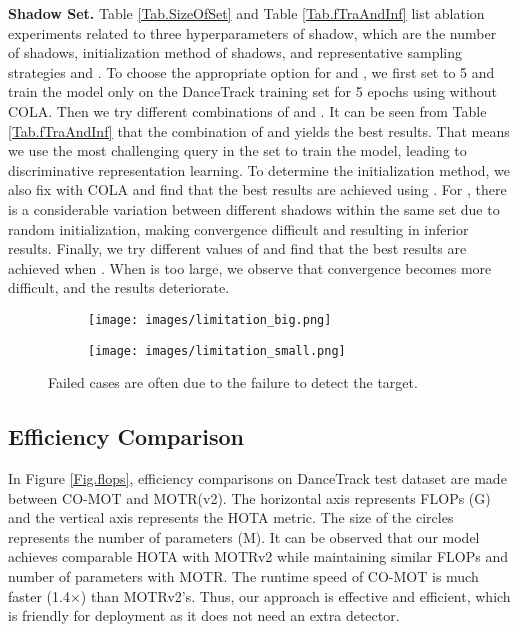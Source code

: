 \documentclass{article}
\begin{document}
\textbf{Shadow Set.} Table \ref{Tab.SizeOfSet} and Table \ref{Tab.fTraAndInf} list ablation experiments related to three hyperparameters of shadow, which are the number of shadows, initialization method of shadows, and representative sampling strategies  and . 
To choose the appropriate option for  and , we first set  to 5 and train the model only on the DanceTrack training set for 5 epochs using  without COLA. Then we try different combinations of  and . It can be seen from Table \ref{Tab.fTraAndInf} that the combination of  and  yields the best results. That means we use the most challenging query in the set to train the model, leading to discriminative representation learning.
To determine the initialization method, we also fix  with COLA and find that the best results are achieved using . For , there is a considerable variation between different shadows within the same set due to random initialization, making convergence difficult and resulting in inferior results. 
Finally, we try different values of  and find that the best results are achieved when . When  is too large, we observe that convergence becomes more difficult, and the results deteriorate.


\begin{figure}[t]
    \centering
    \begin{subfigure}[b]{0.4\textwidth}
        \centering
        \texttt{[image: images/limitation\_big.png]}
        \caption{}
        \label{fig:subfig1}
    \end{subfigure}
    \hspace{0.05\linewidth}
    \begin{subfigure}[b]{0.4\textwidth}
        \centering
        \texttt{[image: images/limitation\_small.png]}
        \caption{}
        \label{fig:subfig2}
    \end{subfigure}
    \caption{Failed cases are often due to the failure to detect the target.}
    \label{fig:limitaiton}
\end{figure}

\subsection{Efficiency Comparison}
In Figure \ref{Fig.flops}, efficiency comparisons on DanceTrack test dataset are made between CO-MOT and MOTR(v2). The horizontal axis represents FLOPs (G) and the vertical axis represents the HOTA metric. The size of the circles represents the number of parameters (M). It can be observed that our model achieves comparable HOTA with MOTRv2 while maintaining similar FLOPs and number of parameters with MOTR. The runtime speed of CO-MOT is much faster (1.4×) than MOTRv2's. Thus, our approach is effective and efficient, which is friendly for deployment as it does not need an extra detector.
\end{document}
